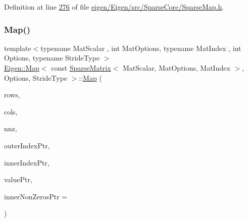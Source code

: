 Definition at line \hyperlink{eigen_2_eigen_2src_2_sparse_core_2_sparse_map_8h_source_l00276}{276} of file \hyperlink{eigen_2_eigen_2src_2_sparse_core_2_sparse_map_8h_source}{eigen/\+Eigen/src/\+Sparse\+Core/\+Sparse\+Map.\+h}.

\mbox{\label{class_eigen_1_1_map_3_01const_01_sparse_matrix_3_01_mat_scalar_00_01_mat_options_00_01_mat_index4032bba20cf92aab8bcf07e926e15a4f_a8075e61ba51d1aa5858b0163e80eca8b}} 
\subsubsection{\texorpdfstring{Map()}{Map()}\hspace{0.1cm}{\footnotesize\ttfamily [2/2]}}
{\footnotesize\ttfamily template$<$typename Mat\+Scalar , int Mat\+Options, typename Mat\+Index , int Options, typename Stride\+Type $>$ \\
\hyperlink{group___core___module_class_eigen_1_1_map}{Eigen\+::\+Map}$<$ const \hyperlink{group___sparse_core___module_class_eigen_1_1_sparse_matrix}{Sparse\+Matrix}$<$ Mat\+Scalar, Mat\+Options, Mat\+Index $>$, Options, Stride\+Type $>$\+::\hyperlink{group___core___module_class_eigen_1_1_map}{Map} (\begin{DoxyParamCaption}\item[{\hyperlink{namespace_eigen_a62e77e0933482dafde8fe197d9a2cfde}{Index}}]{rows,  }\item[{\hyperlink{namespace_eigen_a62e77e0933482dafde8fe197d9a2cfde}{Index}}]{cols,  }\item[{\hyperlink{namespace_eigen_a62e77e0933482dafde8fe197d9a2cfde}{Index}}]{nnz,  }\item[{const Storage\+Index $\ast$}]{outer\+Index\+Ptr,  }\item[{const Storage\+Index $\ast$}]{inner\+Index\+Ptr,  }\item[{const Scalar $\ast$}]{value\+Ptr,  }\item[{const Storage\+Index $\ast$}]{inner\+Non\+Zeros\+Ptr = {} }\end{DoxyParamCaption})\hspace{0.3cm}{\ttfamily [inline]}}

